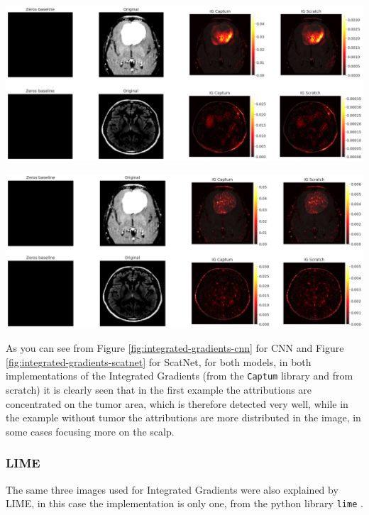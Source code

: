 \documentclass[11pt]{article}
\newenvironment{Figure}
  {\par\medskip\noindent\minipage{\linewidth}}
  {\endminipage\par\medskip}
\begin{document}
\begin{multicols*}{2}
\begin{Figure}
    \includegraphics[width=\linewidth]{images/IG_CNN.png}
    \label{fig:integrated-gradients-cnn}
\end{Figure}

\begin{Figure}
    \includegraphics[width=\linewidth]{images/IG_SCATNET.png}
    \label{fig:integrated-gradients-scatnet}
\end{Figure}

As you can see from Figure \ref{fig:integrated-gradients-cnn} for CNN and Figure \ref{fig:integrated-gradients-scatnet} for ScatNet, for both models, in both implementations of the Integrated Gradients (from the \texttt{Captum} library and from scratch) it is clearly seen that in the first example the attributions are concentrated on the tumor area, which is therefore detected very well, while in the example without tumor the attributions are more distributed in the image, in some cases focusing more on the scalp.

\subsubsection{LIME}
The same three images used for Integrated Gradients were also explained by LIME, in this case the implementation is only one, from the python library \texttt{lime} \cite{limepackage}.


\end{multicols*}
\end{document}
